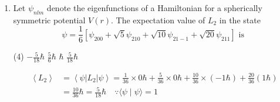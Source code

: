 \begin{enumerate}
{}
\begin{tasks}(4)
\task[\textbf{A.}] $0.60$
\task[\textbf{B.}] $0.90$
\task[\textbf{C.}]  $0.16$
\task[\textbf{D.}] $0.32$
\end{tasks}
\begin{answer}
\begin{align*}
\text{Probability: }\int_{0}^{a_{0}}\left|\frac{1}{\sqrt{\pi a_{0}^{3}}} e^{-r / a_{0}}\right|^{2} 4 \pi r^{2} d r&=\frac{4 \pi}{\pi a_{0}^{3}} \int_{0}^{a_{0}} r^{2} e^{-2 r / a_{0}} d r
\intertext{$=\frac{4}{a_{0}^{3}}\left\{\left[r^{2} e^{-2 r / a_{0}}\left(-\frac{a_{0}}{2}\right)\right]_{0}^{a_{0}}-\left[2 r\left(e^{-2 r / a_{0}}\right)\left(-\frac{a_{0}}{2}\right)\left(-\frac{a_{0}}{2}\right)\right]_{0}^{a_{0}}+\left[2 e^{-2 r / a_{0}}\left(-\frac{a_{0}}{2}\right)\left(-\frac{a_{0}}{2}\right)\left(-\frac{a_{0}}{2}\right)\right]_{0}^{\varphi_{0}}\right\}$}
\intertext{$=\frac{4}{a_{0}^{3}}\left[a_{0}^{2} e^{-\frac{2 a_{0}}{a_{0}}}\left(-\frac{a_{0}}{2}\right)-2 a_{0}\left(\frac{a_{0}^{2}}{4}\right) e^{-2 a_{0} / a_{0}}-\frac{a_{0}^{3}}{4} e^{-2 a_{0} / a_{0}}+2 e^{-0}\left(\frac{a_{0}^{3}}{8}\right)\right]$}\\
=\frac{4}{a_{0}^{3}}\left[-\frac{a_{0}^{3}}{2} \frac{1}{e^{2}}-\frac{a_{0}^{3}}{2} \frac{1}{e^{2}}-\frac{a_{0}^{3}}{4 e^{2}}+\frac{a_{0}^{3}}{4}\right]&=4\left[-\frac{5}{4 e^{2}}+\frac{1}{4}\right]=\left[-5 \times \frac{1}{e^{2}}+1\right]\\
&=[-5 \times 0.137+1]=[-0.685+1]=0.32
\end{align*}
So the correct answer is \textbf{Option (D)}
\end{answer}	
\item Let $\psi_{n l m}$ denote the eigenfunctions of a Hamiltonian for a spherically symmetric potential $V(r)$. The expectation value of $L_{2}$ in the state
$$
\psi=\frac{1}{6}\left[\psi_{200}+\sqrt{5} \psi_{210}+\sqrt{10} \psi_{21-1}+\sqrt{20} \psi_{211}\right] \text { is }
$$
{}
\begin{tasks}(4)
\task[\textbf{A.}] $-\frac{5}{18} \hbar$
\task[\textbf{B.}] $\frac{5}{6} \hbar$
\task[\textbf{C.}] $\hbar$
\task[\textbf{D.}] $\frac{5}{18} \hbar$
\end{tasks}
\begin{answer}
\begin{align*}
\left\langle L_{2}\right\rangle&=\left\langle\psi\left|L_{2}\right| \psi\right\rangle=\frac{1}{36} \times 0 \hbar+\frac{5}{36} \times 0 \hbar+\frac{10}{36} \times(-1 \hbar)+\frac{20}{36}(1 \hbar)\\&=\frac{10}{36} \hbar=\frac{5}{18} \hbar \quad \because\langle\psi \mid \psi\rangle=1

\end{align*}
\end{answer}
\end{enumerate}
